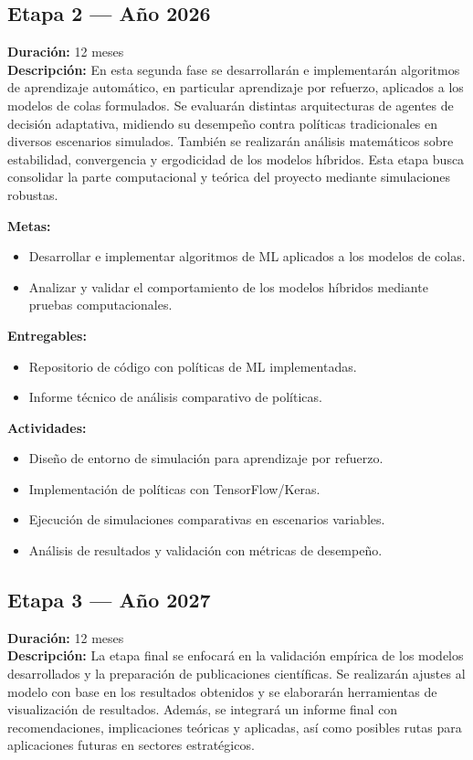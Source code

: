 \documentclass[12pt]{article}
\begin{document}
\subsection*{Etapa 2 — Año 2026}
\textbf{Duración:} 12 meses\\
\textbf{Descripción:} En esta segunda fase se desarrollarán e implementarán algoritmos de aprendizaje automático, en particular aprendizaje por refuerzo, aplicados a los modelos de colas formulados. Se evaluarán distintas arquitecturas de agentes de decisión adaptativa, midiendo su desempeño contra políticas tradicionales en diversos escenarios simulados. También se realizarán análisis matemáticos sobre estabilidad, convergencia y ergodicidad de los modelos híbridos. Esta etapa busca consolidar la parte computacional y teórica del proyecto mediante simulaciones robustas.

\textbf{Metas:}
\begin{itemize}
  \item Desarrollar e implementar algoritmos de ML aplicados a los modelos de colas.
  \item Analizar y validar el comportamiento de los modelos híbridos mediante pruebas computacionales.
\end{itemize}

\textbf{Entregables:}
\begin{itemize}
  \item Repositorio de código con políticas de ML implementadas.
  \item Informe técnico de análisis comparativo de políticas.
\end{itemize}

\textbf{Actividades:}
\begin{itemize}
  \item Diseño de entorno de simulación para aprendizaje por refuerzo.
  \item Implementación de políticas con TensorFlow/Keras.
  \item Ejecución de simulaciones comparativas en escenarios variables.
  \item Análisis de resultados y validación con métricas de desempeño.
\end{itemize}

\subsection*{Etapa 3 — Año 2027}
\textbf{Duración:} 12 meses\\
\textbf{Descripción:} La etapa final se enfocará en la validación empírica de los modelos desarrollados y la preparación de publicaciones científicas. Se realizarán ajustes al modelo con base en los resultados obtenidos y se elaborarán herramientas de visualización de resultados. Además, se integrará un informe final con recomendaciones, implicaciones teóricas y aplicadas, así como posibles rutas para aplicaciones futuras en sectores estratégicos.
\end{document}
